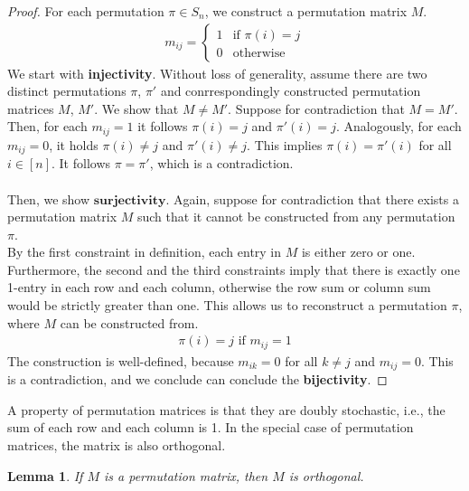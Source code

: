 \documentclass[12pt,letterpaper]{article}
\newtheorem{lemma}[theorem]{Lemma}
\begin{document}
\begin{proof}
    For each permutation $\pi \in S_n$, we construct a permutation matrix $M$.
    \begin{align*}
        m_{ij} = 
        \begin{cases}
            1 & \text{if } \pi(i) = j \\
            0 & \text{otherwise}
        \end{cases}
    \end{align*}
    We start with \textbf{injectivity}. Without loss of generality, assume there are two distinct permutations $\pi$, $\pi'$ and conrrespondingly 
    constructed permutation matrices $M$, $M'$. We show that $M \neq M'$. Suppose for contradiction that $M = M'$.
    Then, for each $m_{ij} = 1$ it follows $\pi(i) = j$ and $\pi'(i) = j$. Analogously, for each $m_{ij} = 0$, it holds $\pi(i) \neq j$ and $\pi'(i) \neq j$.
    This implies $\pi(i) = \pi'(i)$ for all $i \in [n]$. It follows $\pi = \pi'$, which is a contradiction. \\\\
    Then, we show $\textbf{surjectivity}$. Again, suppose for contradiction that there exists a permutation matrix $M$ such that 
    it cannot be constructed from any permutation $\pi$. \\
    By the first constraint in definition, each entry in $M$ is either zero or one. Furthermore, 
    the second and the third constraints imply that there is exactly one 1-entry in each row and each column,
    otherwise the row sum or column sum would be strictly greater than one.
    This allows us to reconstruct a permutation $\pi$, where $M$ can be constructed from. 
    \begin{align*}
        \pi(i) = j \text { if } m_{ij} = 1
    \end{align*}
    The construction is well-defined, because $m_{ik} = 0$ for all $k \neq j$ and $m_{ij} = 0$.
    This is a contradiction, and we conclude can conclude the \textbf{bijectivity}.
\end{proof}
A property of permutation matrices is that they are doubly stochastic, i.e., the sum of each row and each column is 1.
In the special case of permutation matrices, the matrix is also orthogonal.
\begin{lemma}
    If $M$ is a permutation matrix, then $M$ is orthogonal.
\end{lemma}
\end{document}
